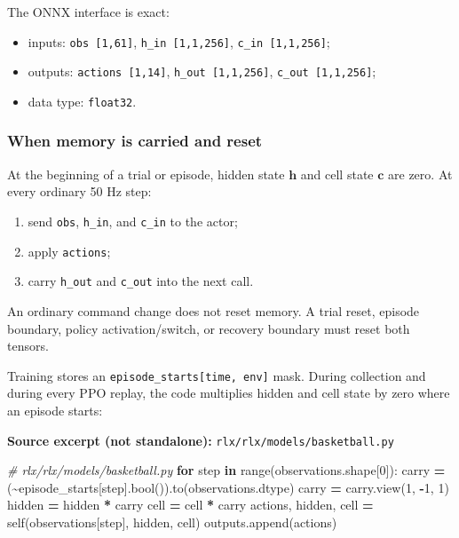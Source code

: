 \documentclass[
  american,
  11pt,
  letterpaper,
]{article}
\newenvironment{Shaded}{\begin{snugshade}}{\end{snugshade}}
\newcommand{\BuiltInTok}[1]{#1}
\newcommand{\CommentTok}[1]{\textcolor[rgb]{0.56,0.35,0.01}{\textit{#1}}}
\newcommand{\ControlFlowTok}[1]{\textcolor[rgb]{0.13,0.29,0.53}{\textbf{#1}}}
\newcommand{\DecValTok}[1]{\textcolor[rgb]{0.00,0.00,0.81}{#1}}
\newcommand{\KeywordTok}[1]{\textcolor[rgb]{0.13,0.29,0.53}{\textbf{#1}}}
\newcommand{\NormalTok}[1]{#1}
\newcommand{\OperatorTok}[1]{\textcolor[rgb]{0.81,0.36,0.00}{\textbf{#1}}}
\newcommand{\VariableTok}[1]{\textcolor[rgb]{0.00,0.00,0.00}{#1}}
\providecommand{\tightlist}{%
  \setlength{\itemsep}{0pt}\setlength{\parskip}{0pt}}
\renewenvironment{Shaded}{\par\smallskip}{\par\smallskip}
\begin{document}
The ONNX interface is exact:

\begin{itemize}
\tightlist
\item
  inputs: \texttt{obs\ {[}1,61{]}}, \texttt{h\_in\ {[}1,1,256{]}},
  \texttt{c\_in\ {[}1,1,256{]}};
\item
  outputs: \texttt{actions\ {[}1,14{]}}, \texttt{h\_out\ {[}1,1,256{]}},
  \texttt{c\_out\ {[}1,1,256{]}};
\item
  data type: \texttt{float32}.
\end{itemize}

\subsubsection{When memory is carried and
reset}\label{when-memory-is-carried-and-reset}

At the beginning of a trial or episode, hidden state \(\mathbf h\) and
cell state \(\mathbf c\) are zero. At every ordinary 50 Hz step:

\begin{enumerate}
\def\labelenumi{\arabic{enumi}.}
\tightlist
\item
  send \texttt{obs}, \texttt{h\_in}, and \texttt{c\_in} to the actor;
\item
  apply \texttt{actions};
\item
  carry \texttt{h\_out} and \texttt{c\_out} into the next call.
\end{enumerate}

An ordinary command change does not reset memory. A trial reset, episode
boundary, policy activation/switch, or recovery boundary must reset both
tensors.

Training stores an \texttt{episode\_starts{[}time,\ env{]}} mask. During
collection and during every PPO replay, the code multiplies hidden and
cell state by zero where an episode starts:

\textbf{Source excerpt (not standalone):}
\texttt{rlx/\allowbreak{}rlx/\allowbreak{}models/\allowbreak{}basketba\allowbreak{}ll.py}

\begin{Shaded}
\begin{Highlighting}[]
\CommentTok{\# rlx/rlx/models/basketball.py}
\ControlFlowTok{for}\NormalTok{ step }\KeywordTok{in} \BuiltInTok{range}\NormalTok{(observations.shape[}\DecValTok{0}\NormalTok{]):}
\NormalTok{    carry }\OperatorTok{=}\NormalTok{ (}\OperatorTok{\textasciitilde{}}\NormalTok{episode\_starts[step].}\BuiltInTok{bool}\NormalTok{()).to(observations.dtype)}
\NormalTok{    carry }\OperatorTok{=}\NormalTok{ carry.view(}\DecValTok{1}\NormalTok{, }\OperatorTok{{-}}\DecValTok{1}\NormalTok{, }\DecValTok{1}\NormalTok{)}
\NormalTok{    hidden }\OperatorTok{=}\NormalTok{ hidden }\OperatorTok{*}\NormalTok{ carry}
\NormalTok{    cell }\OperatorTok{=}\NormalTok{ cell }\OperatorTok{*}\NormalTok{ carry}
\NormalTok{    actions, hidden, cell }\OperatorTok{=} \VariableTok{self}\NormalTok{(observations[step], hidden, cell)}
\NormalTok{    outputs.append(actions)}
\end{Highlighting}
\end{Shaded}
\end{document}
